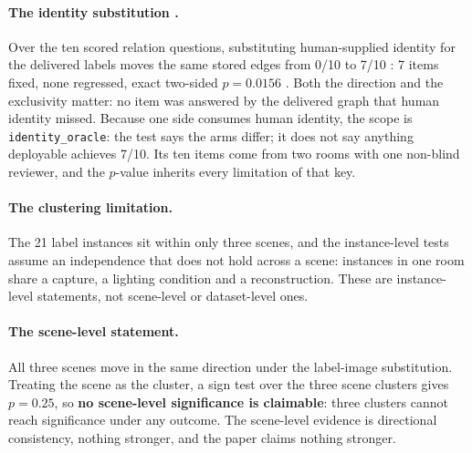 \paragraph{The identity substitution .} Over the ten scored
relation questions, substituting human-supplied identity for the delivered
labels moves the same stored edges from 0/10  to 7/10 :
7 items fixed, none regressed, exact two-sided $p = 0.0156$ . Both
the direction and the exclusivity matter: no item was answered by the
delivered graph that human identity missed. Because one side consumes human
identity, the scope is \texttt{identity\_oracle}: the test says the arms
differ; it does not say anything deployable achieves 7/10. Its ten items
come from two rooms with one non-blind reviewer, and the $p$-value inherits
every limitation of that key.

\paragraph{The clustering limitation.} The 21 label instances sit within
only three scenes, and the instance-level tests assume an independence that
does not hold across a scene: instances in one room share a capture, a
lighting condition and a reconstruction. These are instance-level
statements, not scene-level or dataset-level ones.

\paragraph{The scene-level statement.} All three scenes move in the same
direction under the label-image substitution. Treating the scene as the
cluster, a sign test over the three scene clusters gives $p = 0.25$, so
\textbf{no scene-level significance is claimable}: three clusters cannot
reach significance under any outcome. The scene-level evidence is
directional consistency, nothing stronger, and the paper claims nothing
stronger.
